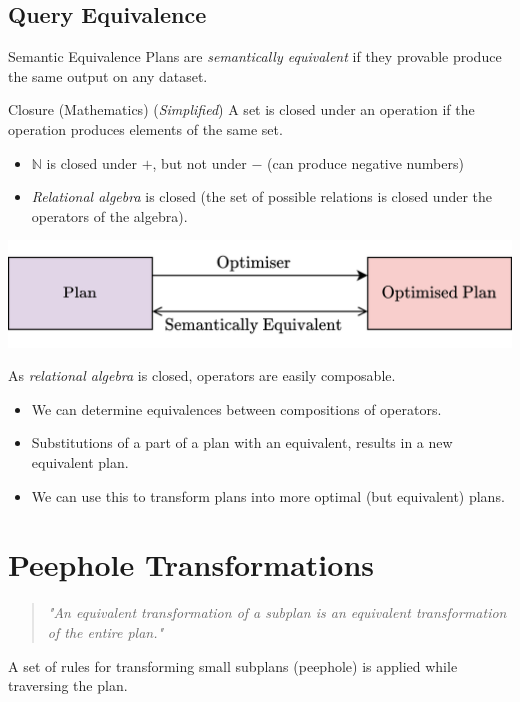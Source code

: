 \subsection{Query Equivalence}
\begin{definitionbox}{Semantic Equivalence}
    Plans are \textit{semantically equivalent} if they provable produce the same output on any dataset.
\end{definitionbox}
\begin{definitionbox}{Closure (Mathematics)}
    (\textit{Simplified}) A set is closed under an operation if the operation produces elements of the same set.
    \begin{itemize}
        \item $\mathbb{N}$ is closed under $+$, but not under $-$ (can produce negative numbers)
        \item \textit{Relational algebra} is closed (the set of possible relations is closed under the operators of the algebra).
    \end{itemize}
\end{definitionbox}
\begin{center}
    \includegraphics[width=.7\textwidth]{optimisation/images/semantic_equivalence.drawio.png}
\end{center}
As \textit{relational algebra} is closed, operators are easily composable.
\begin{itemize}
    \item We can determine equivalences between compositions of operators.
    \item Substitutions of a part of a plan with an equivalent, results in a new equivalent plan.
    \item We can use this to transform plans into more optimal (but equivalent) plans. 
\end{itemize}

\section{Peephole Transformations}
\begin{quote}
    \textit{"An equivalent transformation of a subplan is an equivalent transformation of the entire plan."}
\end{quote}
A set of rules for transforming small subplans (peephole) is applied while traversing the plan.

